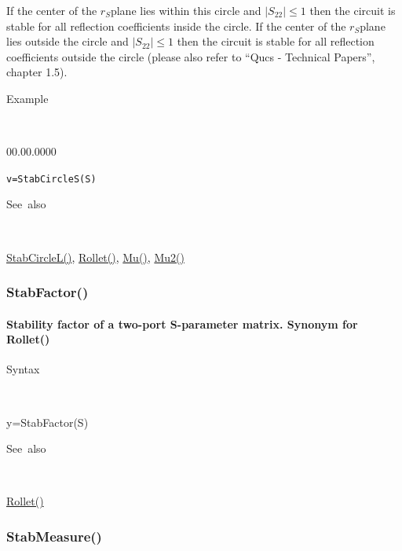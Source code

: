 \noindent If the center of the $r_{S}$plane lies within this circle
and $\left|S_{22}\right|\leq1$ then the circuit is stable for all
reflection coefficients inside the circle. If the center of the $r_{S}$plane
lies outside the circle and $\left|S_{22}\right|\leq1$ then the circuit
is stable for all reflection coefficients outside the circle (please
also refer to {}``Qucs - Technical Papers'', chapter 1.5).

\begin{description}
\item [Example]~
\end{description}
\begin{lyxlist}{00.00.0000}
\item [\texttt{v=StabCircleS(S)}]~
\end{lyxlist}
\begin{description}
\item [See~also]~
\end{description}
\textcolor{blue}{\hyperlink{StabCircleL}{StabCircleL()}}\textcolor{black}{,}
\textcolor{blue}{\hyperlink{Rollet}{Rollet()}}\textcolor{black}{,}
\textcolor{blue}{\hyperlink{Mu}{Mu()}}\textcolor{black}{,} \textcolor{blue}{\hyperlink{Mu2}{Mu2()}}

\newpage
\subsubsection*{\hypertarget{StabFactor}{}{\Large StabFactor()}}


\paragraph{\label{par:StabFactor}Stability factor of a two-port S-parameter matrix. Synonym for Rollet()
}

\begin{description}
\item [Syntax]~
\end{description}
y=StabFactor(S)

\begin{description}
\item [See~also]~
\end{description}
\textcolor{blue}{\hyperlink{Rollet}{Rollet()}}

\newpage
\subsubsection*{\hypertarget{StabMeasure}{}{\Large StabMeasure()}}


